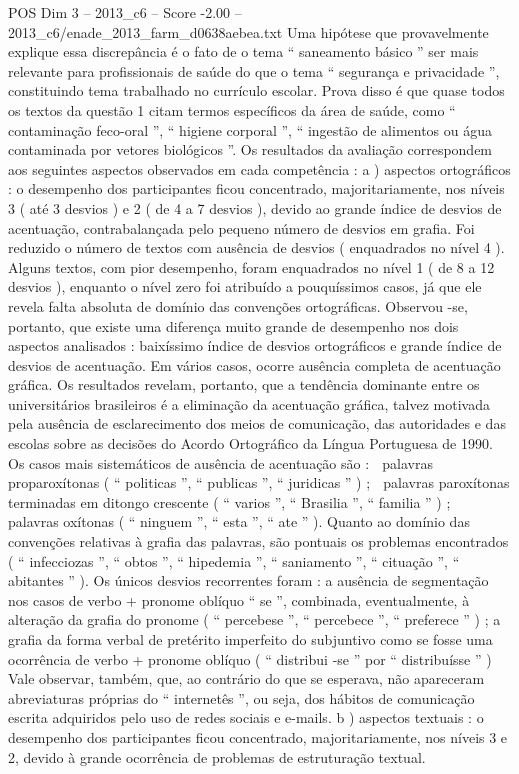 \begin{textsample}{POS Dim 3 – 2013\_c6 – Score -2.00 – 2013\_c6/enade\_2013\_farm\_d0638aebea.txt}
Uma hipótese que provavelmente explique essa discrepância é o fato de o tema “ saneamento básico ” ser mais relevante para profissionais de saúde do que o tema “ segurança e privacidade ”, constituindo tema trabalhado no currículo escolar.
Prova disso é que quase todos os textos da questão 1 citam termos específicos da área de saúde, como “ contaminação feco-oral ”, “ higiene corporal ”, “ ingestão de alimentos ou água contaminada por vetores biológicos ”.
Os resultados da avaliação correspondem aos seguintes aspectos observados em cada competência : a ) aspectos ortográficos : o desempenho dos participantes ficou concentrado, majoritariamente, nos níveis 3 ( até 3 desvios ) e 2 ( de 4 a 7 desvios ), devido ao grande índice de desvios de acentuação, contrabalançada pelo pequeno número de desvios em grafia.
Foi reduzido o número de textos com ausência de desvios ( enquadrados no nível 4 ).
Alguns textos, com pior desempenho, foram enquadrados no nível 1 ( de 8 a 12 desvios ), enquanto o nível zero foi atribuído a pouquíssimos casos, já que ele revela falta absoluta de domínio das convenções ortográficas.
Observou -se, portanto, que existe uma diferença muito grande de desempenho nos dois aspectos analisados : baixíssimo índice de desvios ortográficos e grande índice de desvios de acentuação.
Em vários casos, ocorre ausência completa de acentuação gráfica.
Os resultados revelam, portanto, que a tendência dominante entre os universitários brasileiros é a eliminação da acentuação gráfica, talvez motivada pela ausência de esclarecimento dos meios de comunicação, das autoridades e das escolas sobre as decisões do Acordo Ortográfico da Língua Portuguesa de 1990.
Os casos mais sistemáticos de ausência de acentuação são :  palavras proparoxítonas ( “ politicas ”, “ publicas ”, “ juridicas ” ) ;  palavras paroxítonas terminadas em ditongo crescente ( “ varios ”, “ Brasilia ”, “ familia ” ) ;  palavras oxítonas ( “ ninguem ”, “ esta ”, “ ate ” ).
Quanto ao domínio das convenções relativas à grafia das palavras, são pontuais os problemas encontrados ( “ infecciozas ”, “ obtos ”, “ hipedemia ”, “ saniamento ”, “ cituação ”, “ abitantes ” ).
Os únicos desvios recorrentes foram : a ausência de segmentação nos casos de verbo + pronome oblíquo “ se ”, combinada, eventualmente, à alteração da grafia do pronome ( “ percebese ”, “ percebece ”, “ preferece ” ) ; a grafia da forma verbal de pretérito imperfeito do subjuntivo como se fosse uma ocorrência de verbo + pronome oblíquo ( “ distribui -se ” por “ distribuísse ” ) Vale observar, também, que, ao contrário do que se esperava, não apareceram abreviaturas próprias do “ internetês ”, ou seja, dos hábitos de comunicação escrita adquiridos pelo uso de redes sociais e e-mails. b ) aspectos textuais : o desempenho dos participantes ficou concentrado, majoritariamente, nos níveis 3 e 2, devido à grande ocorrência de problemas de estruturação textual.

\end{textsample}
